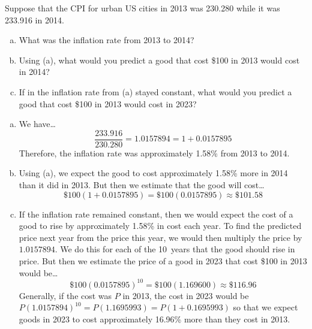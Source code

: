 \documentclass[12pt,letterpaper]{exam}
\begin{document}
\examtitle
{} 
\scores
\bottomline
\newpage

\begin{questions}

\newpage
\question[10] Suppose that the CPI for urban US cities in 2013 was 230.280 while it was 233.916 in 2014. 
	\begin{enumerate}[(a)]
	\item What was the inflation rate from 2013 to 2014?
	\item Using (a), what would you predict a good that cost \$100 in 2013 would cost in 2014?
	\item If in the inflation rate from (a) stayed constant, what would you predict a good that cost \$100 in 2013 would cost in 2023?
	\end{enumerate} \pspace

{\itshape 
\sol 
\begin{enumerate}[(a)]
\item We have\dots
	\[
	\dfrac{233.916}{230.280}= 1.0157894= 1 + 0.0157895
	\]
Therefore, the inflation rate was approximately 1.58\% from 2013 to 2014. \pspace

\item Using (a), we expect the good to cost approximately 1.58\% more in 2014 than it did in 2013. But then we estimate that the good will cost\dots
	\[
	\$100(1 + 0.0157895)= \$100(0.0157895) \approx \$101.58
	\]

\item If the inflation rate remained constant, then we would expect the cost of a good to rise by approximately 1.58\% in cost each year. To find the predicted price next year from the price this year, we would then multiply the price by $1.0157894$. We do this for each of the 10~years that the good should rise in price. But then we estimate the price of a good in 2023 that cost \$100 in 2013 would be\dots
	\[
	\$100(0.0157895)^{10}= \$100(1.169600) \approx \$116.96
	\]
Generally, if the cost was $P$ in 2013, the cost in 2023 would be $P(1.0157894)^{10}= P(1.1695993)= P(1 + 0.1695993)$ so that we expect goods in 2023 to cost approximately 16.96\% more than they cost in 2013. 
\end{enumerate}
}




\end{questions}
\end{document}
